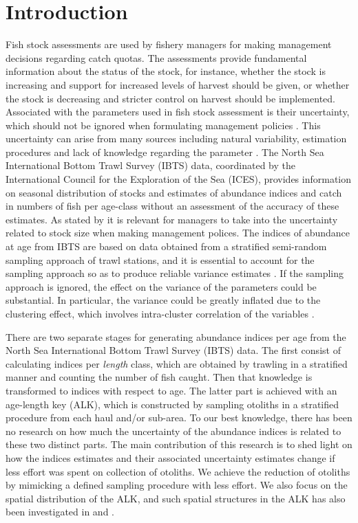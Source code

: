 \documentclass[a4paper 12pt]{article}
\numberwithin{equation}{section}
\begin{document}
\section{Introduction}
Fish stock assessments are used by fishery managers for making management decisions regarding catch quotas. The assessments provide fundamental information about the status of the stock, for instance, whether the stock is increasing and support for increased levels of harvest should be given, or whether the stock is decreasing and stricter control on harvest should be implemented. Associated with the parameters used in fish stock assessment is their uncertainty, which should not be ignored when formulating management policies \citep{walters1981effects, ludwig1981measurement, berg2014evaluation}. This uncertainty can arise from many sources including natural variability, estimation procedures and lack of knowledge regarding the parameter \citep{ehrhardt1997role}. The North Sea International Bottom Trawl Survey (IBTS) data, coordinated by the International Council for the Exploration of the Sea (ICES), provides information on seasonal distribution of stocks and estimates of abundance indices and catch in numbers of fish per age-class without an assessment of the accuracy of these estimates. As stated by \citet{ludwig1981measurement} it is relevant for managers to take into the uncertainty related to stock size when making management polices. The indices of abundance at age from IBTS  are based on data obtained from a stratified semi-random sampling approach of trawl stations,  and  it is essential to account for the sampling approach so as to produce reliable variance estimates \citep{lehtonen2004practical}. If the sampling approach is ignored, the effect on the variance  of the parameters could be substantial.  In particular, the variance could be greatly inflated  due to the clustering effect, which involves intra-cluster correlation of the variables \citep{aanes2015efficient, lehtonen2004practical}. 

There are two separate stages for generating abundance indices per age from the North Sea International Bottom Trawl Survey (IBTS) data.  The first consist of calculating indices per \textit{length} class, which are obtained by trawling in a stratified manner and counting the number of fish caught. Then that knowledge is transformed to indices with respect to age. The latter part is achieved with an age-length key (ALK), which is constructed by sampling otoliths in a stratified procedure from each haul and/or sub-area. To our best knowledge, there has been no research on how much the uncertainty of the abundance indices is related to these two distinct parts. The main contribution of this research is to shed light on how the indices estimates and their associated uncertainty estimates change if less effort was spent on collection of otoliths. We achieve the reduction of otoliths by mimicking a defined sampling procedure with less effort. We also focus on the spatial distribution of the ALK, and such spatial structures in the ALK has also been investigated in \citet{berg2012spatial} and  \citet{hirst2012bayesian}.
\end{document}
